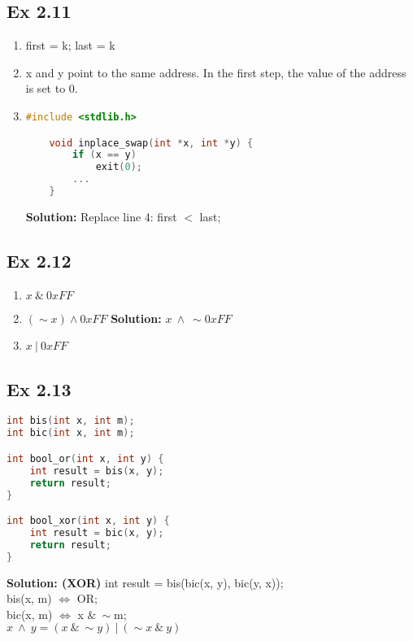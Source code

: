 \subsection{Ex 2.11}
\begin{enumerate}
    \item first = k; last = k
    \item x and y point to the same address. In the first step, the value of the address is set to 0.
    \item \begin{lstlisting}[language=C]
    #include <stdlib.h>

    void inplace_swap(int *x, int *y) {
        if (x == y)
            exit(0);
        ...
    }
    \end{lstlisting}
    \color{red}\textbf{Solution: } Replace line 4: first $<$ last;
\end{enumerate}

\subsection{Ex 2.12}
\begin{enumerate}
    \item $x\ \&\ 0xFF$
    \item $(\sim x)\land 0xFF$ {\color{blue}\textbf{Solution: } $x\ \land\ \sim 0xFF$}
    \item $x\ |\ 0xFF$
\end{enumerate}

\subsection{Ex 2.13}
\begin{lstlisting}[language=C]
int bis(int x, int m);
int bic(int x, int m);

int bool_or(int x, int y) {
    int result = bis(x, y);
    return result;
}

int bool_xor(int x, int y) {
    int result = bic(x, y); 
    return result;
}
\end{lstlisting}
{\color{red}\textbf{Solution: (XOR) }int result = bis(bic(x, y), bic(y, x));\\
bis(x, m) $\Leftrightarrow$ OR;\\
bic(x, m) $\Leftrightarrow$ x $\&\ \sim$m;\\
$x\ \land\ y = (x\ \&\ \sim y)\ |\ (\sim x\ \&\ y)$
}

